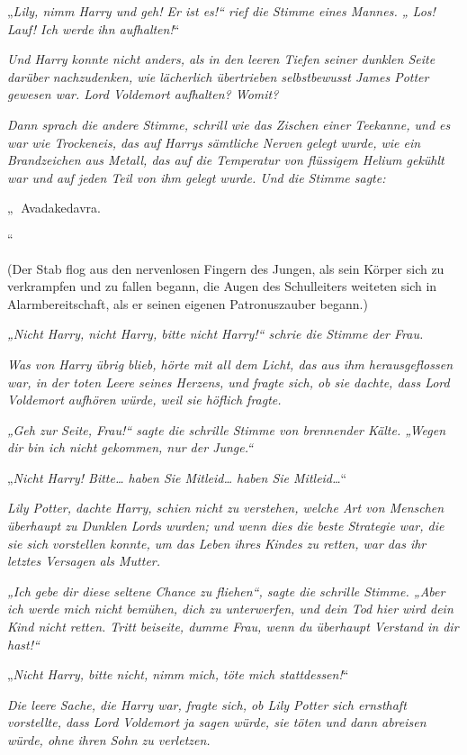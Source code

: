 {„\emph{Lily, nimm Harry und geh! Er ist es!“ rief die Stimme eines Mannes. „ Los! Lauf! Ich werde} \emph{ihn aufhalten!}“

\emph{Und Harry konnte nicht anders, als in den leeren Tiefen seiner dunklen Seite darüber nachzudenken, wie lächerlich übertrieben selbstbewusst James Potter gewesen war. Lord Voldemort aufhalten? Womit?}

\emph{\emph{Dann sprach die andere Stimme, schrill wie das Zischen einer Teekanne, und es war wie Trockeneis, das auf Harrys sämtliche Nerven gelegt wurde, wie ein} \emph{Brandzeichen} \emph{aus Metall, das auf} \emph{die Temperatur von} \emph{flüssigem} \emph{Helium gekühlt} \emph{war} \emph{und auf jeden Teil von ihm gelegt wurde. Und die Stimme sagte:}}

„ Avadakedavra.}“

(Der Stab flog aus den nervenlosen Fingern des Jungen, als sein Körper sich zu verkrampfen und zu fallen begann, die Augen des Schulleiters weiteten sich in Alarmbereitschaft, als er seinen eigenen Patronuszauber begann.)

\emph{„Nicht Harry, nicht Harry, bitte nicht Harry!“ schrie die Stimme der Frau.}

\emph{Was von Harry übrig blieb, hörte mit all dem Licht, das aus ihm herausgeflossen war, in der toten Leere seines Herzens, und fragte sich, ob sie dachte, dass Lord Voldemort aufhören würde, weil sie höflich fragte.}

\emph{„Geh zur Seite, Frau!“ sagte die schrille Stimme von brennender Kälte. „Wegen dir bin ich nicht gekommen, nur der Junge.“}

„\emph{Nicht Harry! Bitte… haben Sie Mitleid… haben Sie Mitleid…}“

\emph{Lily Potter, dachte Harry, schien nicht zu verstehen, welche Art von Menschen überhaupt zu Dunklen Lords wurden; und wenn dies die beste Strategie war, die sie sich vorstellen konnte, um das Leben ihres Kindes zu retten, war das ihr letztes Versagen als Mutter.}

\emph{„Ich gebe dir diese seltene Chance zu fliehen“, sagte die schrille Stimme. „Aber ich werde mich nicht bemühen, dich zu unterwerfen, und dein Tod hier wird dein Kind nicht retten. Tritt beiseite, dumme Frau, wenn du überhaupt Verstand in dir hast!“}

„\emph{Nicht Harry, bitte nicht, nimm mich, töte mich stattdessen!}“

\emph{Die leere Sache, die Harry war, fragte sich, ob Lily Potter sich ernsthaft vorstellte, dass Lord Voldemort ja sagen würde, sie töten und dann abreisen würde, ohne ihren Sohn zu verletzen.}

